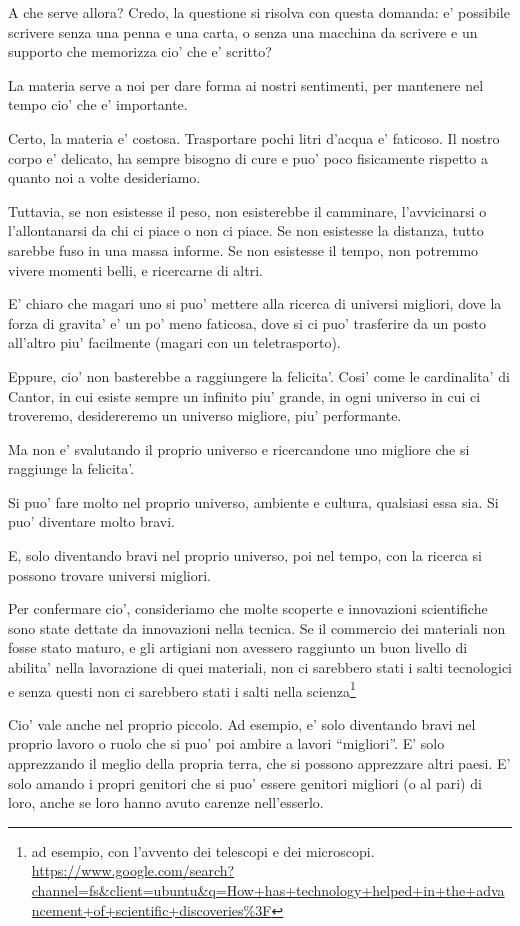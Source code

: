 A che serve allora? Credo, la questione si risolva con questa domanda: e' possibile scrivere senza una penna e una carta, o senza una macchina da scrivere e un supporto che memorizza cio' che e' scritto?

La materia serve a noi per dare forma ai nostri sentimenti, per mantenere nel tempo cio' che e' importante.

Certo, la materia e' costosa. Trasportare pochi litri d'acqua e' faticoso. Il nostro corpo e' delicato, ha sempre bisogno di cure e puo' poco fisicamente rispetto a quanto noi a volte desideriamo.

Tuttavia, se non esistesse il peso, non esisterebbe il camminare, l'avvicinarsi o l'allontanarsi da chi ci piace o non ci piace. Se non esistesse la distanza, tutto sarebbe fuso in una massa informe. Se non esistesse il tempo, non potremmo vivere momenti belli, e ricercarne di altri.

E' chiaro che magari uno si puo' mettere alla ricerca di universi migliori, dove la forza di gravita' e' un po' meno faticosa, dove si ci puo' trasferire da un posto all'altro piu' facilmente (magari con un teletrasporto).

Eppure, cio' non basterebbe a raggiungere la felicita'. Cosi' come le cardinalita' di Cantor, in cui esiste sempre un infinito piu' grande, in ogni universo in cui ci troveremo, desidereremo un universo migliore, piu' performante.

Ma non e' svalutando il proprio universo e ricercandone uno migliore che si raggiunge la felicita'.

Si puo' fare molto nel proprio universo, ambiente e cultura, qualsiasi essa sia. Si puo' diventare molto bravi.

E, solo diventando bravi nel proprio universo, poi nel tempo, con la ricerca si possono trovare universi migliori.

Per confermare cio', consideriamo che molte scoperte e innovazioni scientifiche sono state dettate da innovazioni nella tecnica. Se il commercio dei materiali non fosse stato maturo, e gli artigiani non avessero raggiunto un buon livello di abilita' nella lavorazione di quei materiali, non ci sarebbero stati i salti tecnologici e senza questi non ci sarebbero stati i salti nella scienza\footnote{ad esempio, con l'avvento dei telescopi e dei microscopi. \url{https://www.google.com/search?channel=fs&client=ubuntu\&q=How+has+technology+helped+in+the+advancement+of+scientific+discoveries\%3F}}

Cio' vale anche nel proprio piccolo. Ad esempio, e' solo diventando bravi nel proprio lavoro o ruolo che si puo' poi ambire a lavori ``migliori''. E' solo apprezzando il meglio della propria terra, che si possono apprezzare altri paesi. E' solo amando i propri genitori che si puo' essere genitori migliori (o al pari) di loro, anche se loro hanno avuto carenze nell'esserlo.

